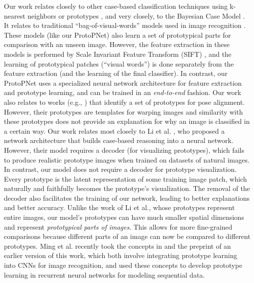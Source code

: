 \documentclass{article}
\theoremstyle{definition}
\theoremstyle{remark}
\begin{document}
Our work relates closely to other case-based classification techniques using k-nearest neighbors \cite{weinberger2009distance,pmlr-v2-salakhutdinov07a,papernot2018deep} or prototypes \cite{Priebe2003,Bien2011,WuTabak2017}, and very closely, to the Bayesian Case Model \cite{KimRuSh14}. It relates to traditional ``bag-of-visual-words'' models used in image recognition \cite{lazebnik2006beyond,fei2005bayesian,jiang2007towards,sivic2003video,nister2006scalable}. These models (like our ProtoPNet) also learn a set of prototypical parts for comparison with an unseen image. However, the feature extraction in these models is performed by Scale Invariant Feature Transform (SIFT) \cite{lowe1999object}, and the learning of prototypical patches (``visual words'') is done separately from the feature extraction (and the learning of the final classifier). In contrast, our ProtoPNet uses a specialized neural network architecture for feature extraction and prototype learning, and can be trained in an \textit{end-to-end} fashion. Our work also relates to works (e.g., \cite{branson2014bird,lin2015deep}) that identify a set of prototypes for pose alignment. However, their prototypes are templates for warping images and similarity with these prototypes does not provide an explanation for why an image is classified in a certain way.
Our work relates most closely to Li et al. \cite{LiLiuChenRudin}, who proposed a network architecture that builds case-based reasoning into a neural network. However, their model requires a decoder (for visualizing prototypes),
which fails to produce realistic prototype images when trained on datasets of natural images.
In contrast, our model does not require a decoder for prototype visualization. Every prototype is the latent representation of some training image patch, which naturally and faithfully becomes the prototype's visualization. The removal of the decoder also facilitates the training of our network, leading to better explanations and better accuracy. Unlike the work of Li et al., whose prototypes represent entire images, our model's prototypes can have much smaller spatial dimensions and represent \textit{prototypical parts of images}. This allows for more fine-grained comparisons because different parts of an image can now be compared to different prototypes.
Ming et al. \cite{ming2019interpretable} recently took the concepts in \cite{LiLiuChenRudin} and the preprint of an earlier version of this work, which both involve integrating prototype learning into CNNs for image recognition, and used these concepts to develop prototype learning in recurrent neural networks for modeling sequential data.
\end{document}
